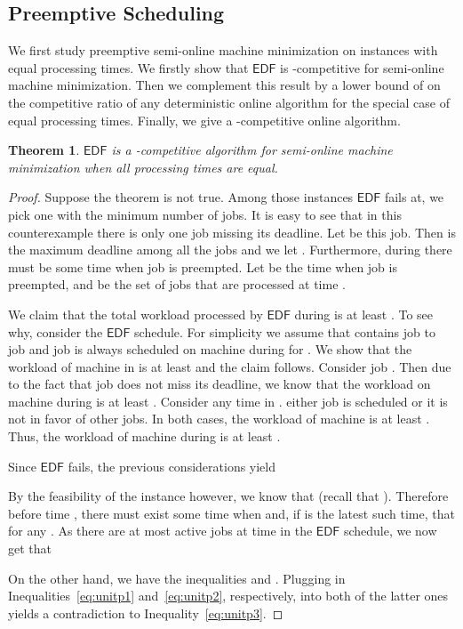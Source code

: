 \documentclass[letterpaper,11pt]{article}
\newtheorem{theorem}{Theorem}
\newcommand{\EDF}{\ensuremath{\mathsf{EDF}}\xspace}
\begin{document}
\subsection{Preemptive Scheduling}

We first study preemptive semi-online machine minimization on instances with equal processing times. We firstly show that \EDF is -competitive for semi-online machine minimization. Then we complement this result by a lower bound of  on the competitive ratio of any deterministic online algorithm for the special case of equal processing times. Finally, we give a -competitive online algorithm.





\begin{theorem}\label{thm:pre-samesize-optknown-EDF}
\EDF is a -competitive algorithm for semi-online machine minimization when all processing times are equal.
\end{theorem} 
\begin{proof}
Suppose the theorem is not true. Among those instances \EDF fails at, we pick one with the minimum number of jobs. It is easy to see that in this counterexample there is only one job missing its deadline. Let  be this job. Then  is the maximum deadline among all the jobs and we let . Furthermore, during  there must be some time when job  is preempted. Let  be the time when job  is preempted, and  be the set of jobs that are processed at time . 


We claim that the total workload processed by \EDF during  is at least . To see why, consider the \EDF schedule. For simplicity we assume that  contains job  to job  and job  is always scheduled on machine  during  for . We show that the workload of machine  in  is at least  and the claim follows. Consider job . Then due to the fact that job  does not miss its deadline, we know that the workload on machine  during  is at least . Consider any time in . either job  is scheduled or it is not in favor of other jobs. In both cases, the workload of machine  is at least . Thus, the workload of machine  during  is at least .

Since \EDF fails, the previous considerations yield 

By the feasibility of the instance however, we know that 
 (recall that ). Therefore before time , there must exist some time  when  and, if  is the latest such time, that  for any . As there are at most  active jobs at time  in the \EDF schedule, we now get that 

On the other hand, we have the inequalities  and . Plugging in Inequalities~\ref{eq:unitp1} and~\ref{eq:unitp2}, respectively, into both of the latter ones yields a contradiction to Inequality~\ref{eq:unitp3}.
\end{proof}
\end{document}
